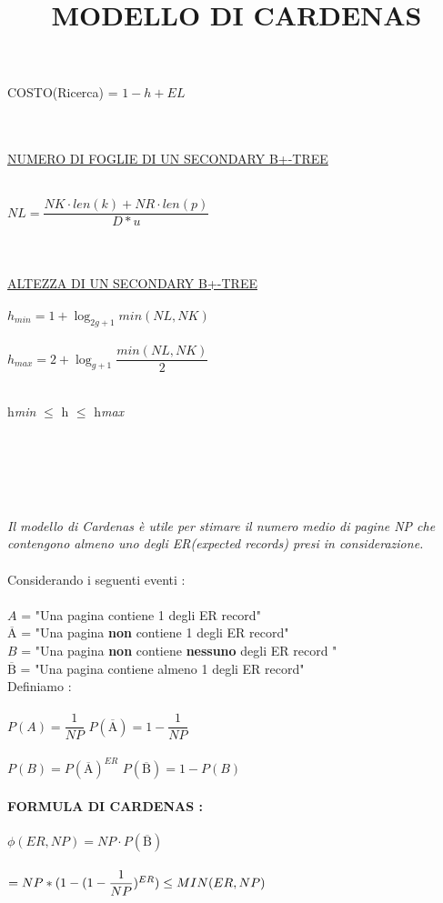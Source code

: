\documentclass[a4paper,12pt]{article}
\newcommand{\Anegato}{\overline{\text{A}}}
\newcommand{\Bnegato}{\overline{\text{B}}}
\begin{document}
\begin{titlepage}
	\centerline{{\Large COSTO(Ricerca) = ${1 - h + EL}$}} \\ \\
	\underline{NUMERO DI FOGLIE DI UN SECONDARY B+-TREE} \\ \\
	\centerline{${NL = \dfrac{NK \cdot len(k) + NR \cdot len(p)}{D * u}}$}  \\ \\
	\underline{ALTEZZA DI UN SECONDARY B+-TREE} \\ \\
	${h_{min} = 1 + \log_{2g+1}min(NL,NK)}$ \\ \\
	${h_{max} = 2 + \log_{g+1} \dfrac{min(NL, NK)}{2}}$ \\ \\
	\centerline{{\Large h\textit{min} ${\leq}$ h ${\leq}$ h\textit{max}}} \\ \\
	\end{titlepage}
	\begin{titlepage}
	\title{{\huge \textbf{MODELLO DI CARDENAS}}}
	\maketitle\\\\
	\textit{Il modello di Cardenas è utile per stimare il numero medio di pagine NP che contengono almeno uno degli ER(expected records) presi in considerazione.} \\ \\
	Considerando i seguenti eventi : \\ \\
	${A}$ = "Una pagina contiene 1 degli ER record" \\
	${\Anegato}$ = "Una pagina \textbf{non} contiene 1 degli ER record" \\
	${B}$ = "Una pagina \textbf{non} contiene \textbf{nessuno} degli ER record " \\
	${\Bnegato}$ = "Una pagina contiene almeno 1 degli ER record" \\ 		
	Definiamo : \\ \\
	${P(A) = \dfrac{1}{NP} }$\space \space \space \space \space \space \space \space \space \space \space
	${P(\Anegato) = 1 - \dfrac{1}{NP}}$ \\ \\
	${P(B) = P(\Anegato)^{ER}}$ \space \space \space \space \space
	${P(\Bnegato) = 1 - P(B)}$ \\ \\
	\textbf{FORMULA DI CARDENAS :} \\ \\
	${\phi(ER,NP) = NP \cdot P(\Bnegato)}$ \\ \\
	${= NP * (1 - (1 - \dfrac{1}{NP})^{ER}) \space \leq \space MIN(ER, NP)}$
	\end{titlepage}
\end{document}
